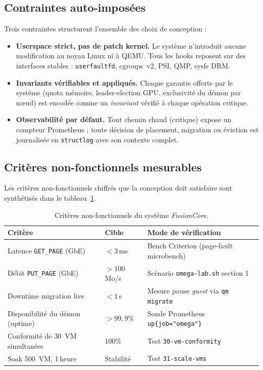 \subsection{Contraintes auto-imposées}

Trois contraintes structurent l'ensemble des choix de conception :

\begin{itemize}[leftmargin=*]
    \item \textbf{Userspace strict, pas de patch kernel.} Le système n'introduit aucune modification au noyau Linux ni à QEMU. Tous les hooks reposent sur des interfaces stables : \texttt{userfaultfd}, cgroups~v2, PSI, QMP, sysfs DRM.
    \item \textbf{Invariants vérifiables et appliqués.} Chaque garantie offerte par le système (quota mémoire, leader-election GPU, exclusivité du démon par nœud) est encodée comme un \emph{invariant} vérifié à chaque opération critique.
    \item \textbf{Observabilité par défaut.} Tout chemin chaud (critique) expose un compteur Prometheus ; toute décision de placement, migration ou éviction est journalisée en \texttt{structlog} avec son contexte complet.
\end{itemize}

\subsection{Critères non-fonctionnels mesurables}

Les critères non-fonctionnels chiffrés que la conception doit satisfaire sont synthétisés dans le tableau~\ref{tab:nfr}.

\begin{table}[H]
\centering
\small
\caption{Critères non-fonctionnels du système \emph{FusionCore}.}
\begin{tabular}{p{4.5cm}p{2.5cm}p{6.5cm}}
\toprule
\textbf{Critère} & \textbf{Cible} & \textbf{Mode de vérification} \\
\midrule
Latence \texttt{GET\_PAGE} (GbE)     & $< 3$\,ms      & Bench Criterion (page-fault microbench) \\
Débit \texttt{PUT\_PAGE} (GbE)       & $> 100$\,Mo/s  & Scénario \texttt{omega-lab.sh} section 1 \\
Downtime migration live              & $< 1$\,s       & Mesure pause \emph{guest} via \texttt{qm migrate} \\
Disponibilité du démon (uptime)      & $> 99{,}9\%$   & Sonde Prometheus \texttt{up\{job="omega"\}} \\
Conformité de 30~VM simultanées      & 100\%          & Test \texttt{30-vm-conformity} \\
Soak 500~VM, 1\,heure                & Stabilité      & Test \texttt{31-scale-vms} \\
\bottomrule
\end{tabular}
\label{tab:nfr}
\end{table}


